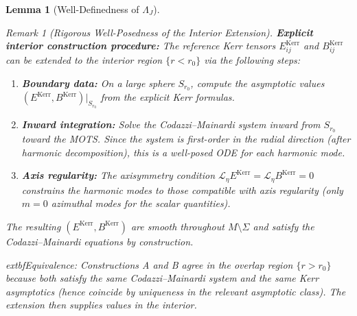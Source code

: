 \documentclass[12pt]{article}
\theoremstyle{plain}
\newtheorem{lemma}[theorem]{Lemma}
\theoremstyle{definition}
\theoremstyle{remark}
\newtheorem{remark}[theorem]{Remark}
\begin{document}
\begin{lemma}[Well-Definedness of $\Lambda_J$]
\begin{remark}[Rigorous Well-Posedness of the Interior Extension]
\textbf{Explicit interior construction procedure:}
The reference Kerr tensors $E^{\mathrm{Kerr}}_{ij}$ and $B^{\mathrm{Kerr}}_{ij}$ can be extended to the interior region $\{r < r_0\}$ via the following steps:
\begin{enumerate}[label=(\alph*)]
    \item \textbf{Boundary data:} On a large sphere $S_{r_0}$, compute the asymptotic values $(E^{\mathrm{Kerr}}, B^{\mathrm{Kerr}})|_{S_{r_0}}$ from the explicit Kerr formulas.
    \item \textbf{Inward integration:} Solve the Codazzi--Mainardi system inward from $S_{r_0}$ toward the MOTS. Since the system is first-order in the radial direction (after harmonic decomposition), this is a well-posed ODE for each harmonic mode.
    \item \textbf{Axis regularity:} The axisymmetry condition $\mathcal{L}_\eta E^{\mathrm{Kerr}} = \mathcal{L}_\eta B^{\mathrm{Kerr}} = 0$ constrains the harmonic modes to those compatible with axis regularity (only $m = 0$ azimuthal modes for the scalar quantities).
\end{enumerate}
The resulting $(E^{\mathrm{Kerr}}, B^{\mathrm{Kerr}})$ are smooth throughout $M \setminus \Sigma$ and satisfy the Codazzi--Mainardi equations by construction.

	extbf{Equivalence:} Constructions A and B agree in the overlap region $\{r > r_0\}$ because both satisfy the same Codazzi--Mainardi system and the same Kerr asymptotics (hence coincide by uniqueness in the relevant asymptotic class). The extension then supplies values in the interior.
\end{remark}
\end{lemma}
\end{document}
